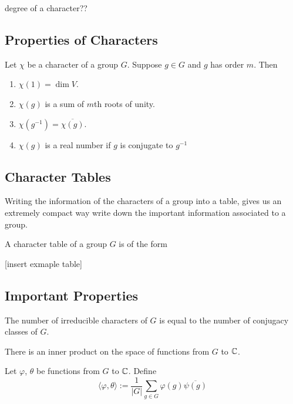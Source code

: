 \begin{definition}
    degree of a character??
\end{definition}

\subsection{Properties of Characters}

\begin{theorem}
    Let $\chi$ be a character of a group $G$. Suppose $g \in G$ and $g$ has order $m$. Then
    \begin{enumerate}
        \item $\chi(1) = \dim V$.
        \item $\chi(g)$ is a sum of $m$th roots of unity.
        \item $\chi(g^{-1}) = \overline{\chi(g)}$.
        \item $\chi(g)$ is a real number if $g$ is conjugate  to $g^{-1}$
    \end{enumerate}
\end{theorem}




\subsection{Character Tables}
    
    Writing the information of the characters of a group into a table, gives us an extremely compact way write down 
    the important information associated to a group.
    

\begin{definition}
    A character table of a group $G$ is of the form 
    

    [insert exmaple table]
\end{definition}




\subsection{Important Properties}


\begin{theorem}
    The number of irreducible characters of $G$ is equal to the number of conjugacy classes of $G$.
\end{theorem}




There is an inner product on the space of functions from $G$ to $\mathbb{C}$.
\begin{definition}
    Let $\varphi$, $\theta$ be functions from $G$ to $\mathbb{C}$. Define
    \[
        \langle \varphi, \theta \rangle := \frac{1}{|G|} \sum_{g \in G} \varphi(g)\overline{\psi(g)}
    \]
\end{definition}



